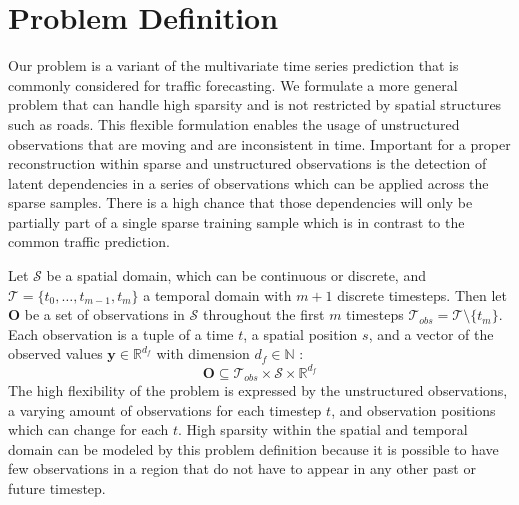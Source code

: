 
\section{Problem Definition}
\label{sec:problem}


Our problem is a variant of the multivariate time series prediction that is commonly considered for traffic forecasting. 
We formulate a more general problem that can handle high sparsity and is not restricted by spatial structures such as roads. 
This flexible formulation enables the usage of unstructured observations that are moving and are inconsistent in time. 
Important for a proper reconstruction within sparse and unstructured observations is the detection of latent dependencies in a series of observations which can be applied across the sparse samples.
There is a high chance that those dependencies will only be partially part of a single sparse training sample which is in contrast to the common traffic prediction.

Let $\mathcal{S}$ be a spatial domain, which can be continuous or discrete, and $\mathcal{T} = \{t_0, \dots, t_{m-1}, t_{m}\}$ a temporal domain with $m+1$ discrete timesteps.
Then let $\mathbf{O}$ be a set of observations in $\mathcal{S}$ throughout the first $m$ timesteps $\mathcal{T}_{obs} = \mathcal{T} \setminus \{t_{m}\}$.
Each observation is a tuple of a time $t$, a spatial position $s$, and a vector of the observed values $\bm{y} \in \mathbb{R}^{d_f}$ with dimension $d_f \in \mathbb{N}$ :
\begin{equation}
    \mathbf{O} \subseteq \mathcal{T}_{obs} \times \mathcal{S} \times \mathbb{R}^{d_f}
\end{equation}
The high flexibility of the problem is expressed by the unstructured observations, a varying amount of observations for each timestep $t$, and observation positions which can change for each $t$.
High sparsity within the spatial and temporal domain can be modeled by this problem definition because it is possible to have few observations in a region that do not have to appear in any other past or future timestep. 


